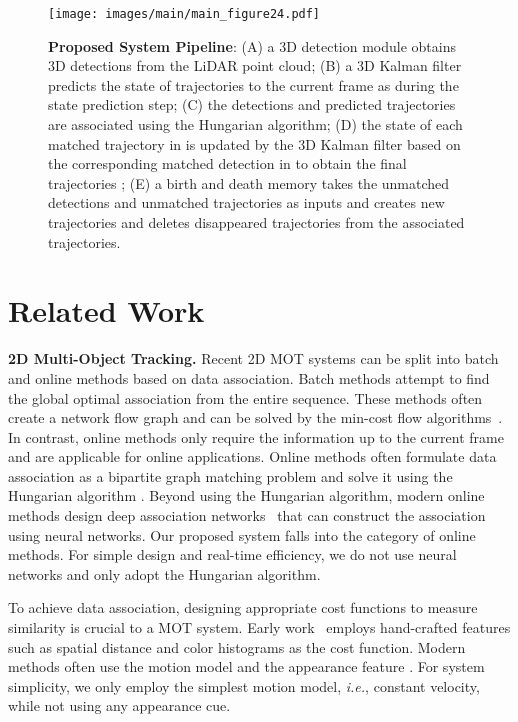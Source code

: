 \documentclass[letterpaper, 10 pt, conference]{ieeeconf}
\begin{document}
\begin{figure*}
\begin{center}
\texttt{[image: images/main/main\_figure24.pdf]}
\end{center}
\vspace{-0.6cm}
\caption{\textbf{Proposed System Pipeline}: (A) a 3D detection module obtains 3D detections  from the LiDAR point cloud; (B) a 3D Kalman filter predicts the state of trajectories  to the current frame  as  during the state prediction step; (C) the detections  and predicted trajectories  are associated using the Hungarian algorithm; (D) the state of each matched trajectory in  is updated by the 3D Kalman filter based on the corresponding matched detection in  to obtain the final trajectories ; (E) a birth and death memory takes the unmatched detections  and unmatched trajectories  as inputs and creates new trajectories  and deletes disappeared trajectories  from the associated trajectories.}
\label{fig:pipeline}
\vspace{-0.5cm}
\end{figure*}



\section{Related Work}

\noindent\textbf{2D Multi-Object Tracking.} Recent 2D MOT systems can be split into batch and online methods based on data association. Batch methods attempt to find the global optimal association from the entire sequence. These methods often create a network flow graph and can be solved by the min-cost flow algorithms~\cite{Zhang2008, Schulter2017}. In contrast, online methods only require the information up to the current frame and are applicable for online applications. Online methods often formulate data association as a bipartite graph matching problem and solve it using the Hungarian algorithm \cite{WKuhn1955, Bewley2016}. Beyond using the Hungarian algorithm, modern online methods design deep association networks~\cite{Baser2019, Weng2020_gnn3dmot} that can construct the association using neural networks. Our proposed system falls into the category of online methods. For simple design and real-time efficiency, we do not use neural networks and only adopt the Hungarian algorithm.

To achieve data association, designing appropriate cost functions to measure similarity is crucial to a MOT system. Early work~\cite{Pirsiavash2015, Zhang2008} employs hand-crafted features such as spatial distance and color histograms as the cost function. Modern methods often use the motion model \cite{Choi2015, Bewley2016, Dicle2013} and the appearance feature \cite{Choi2015, Bae2014, yujhe2020}. For system simplicity, we only employ the simplest motion model, \emph{i.e.}, constant velocity, while not using any appearance cue.
\end{document}
